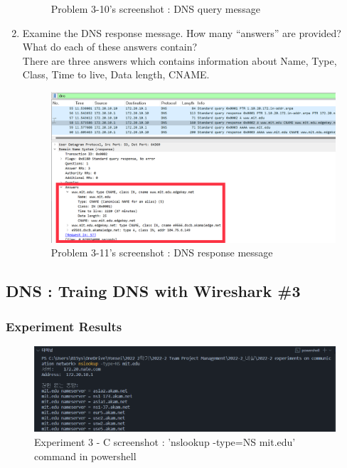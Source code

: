 \begin{enumerate}[label=\bfseries Problem \arabic*:,leftmargin=*,labelindent=1em]
\begin{figure}[!h]
        		\caption{\footnotesize Problem 3-10's screenshot : DNS query message}
        		\vspace{-10pt}
            \end{figure}
        \item Examine the DNS response message. 
        How many “answers” are provided? What do each of these answers contain?\\[0.2mm]
            \soln There are three answers which contains information about Name, Type, Class, Time to live, Data length, CNAME.
            \vspace{-2mm}  
            \begin{figure}[!h]\centering
                \hspace{10mm} 
        		\includegraphics[width=.73\textwidth]{image/result_week01/Q3-b.png}
        		\caption{\footnotesize Problem 3-11's screenshot : DNS response message}
        		\vspace{-10pt}
            \end{figure}
    \end{enumerate}
\subsection{DNS : Traing DNS with Wireshark \#3}
    \subsubsection*{Experiment Results}
        \vspace{-2mm}  
        \begin{figure}[!h]\centering
            \hspace{10mm} 
    		\includegraphics[width=.78\textwidth]{image/result_week01/Q3-c-0.png}
    		\caption{\footnotesize Experiment 3 - C screenshot : 'nslookup -type=NS mit.edu' command in powershell}
    		\vspace{-10pt}
        \end{figure}
\clearpage
